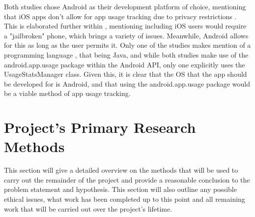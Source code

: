 \documentclass[12pt]{article}
\begin{document}
Both studies chose Android as their development platform of choice, mentioning that iOS apps don't allow for app 
usage tracking due to privacy restrictions 
\autocite{RefWorks:RefID:118-rosa2022problematic, RefWorks:RefID:116-bye2024cohort, applesupport-ifanappasks}. 
This is elaborated further within \textcite{RefWorks:RefID:123-2024mobile}, mentioning including iOS users 
would require a "jailbroken" phone, which brings a variety of issues. Meanwhile, Android allows for this as 
long as the user permits it. Only one of the studies makes mention of a programming language 
\autocite{RefWorks:RefID:118-rosa2022problematic}, that being Java, and while both studies make use of the
android.app.usage package within the Android API, only one \autocite{RefWorks:RefID:118-rosa2022problematic}
explicitly uses the UsageStatsManager class. Given this, it is clear that the OS that the app 
should be developed for is Android, and that using the android.app.usage package would be a viable method of app 
usage tracking.




\newpage


\section{Project's Primary Research Methods}
This section will give a detailed overview on the methods that will be used to carry out the remainder of the 
project and provide a reasonable conclusion to the problem statement and hypothesis. This section will also outline 
any possible ethical issues, what work has been completed up to this point and all remaining work that will be 
carried out over the project's lifetime.


\end{document}
